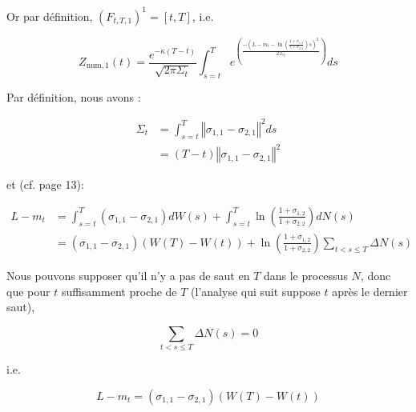 \documentclass[../finalreport.tex]{subfiles}
\begin{document}
\par Or par définition, ${\left( F_{t, T, 1}\right)}^1 = \left[ t, T \right]$, i.e.

\begin{displaymath}
Z_{\text{num}, 1} \left( t \right) =  \dfrac{e^{- {\kappa} \left( T - t\right)}}{\sqrt{2 \pi {\Sigma}_t}} {\displaystyle \int_{s = t}^{T}} e^{\left( \frac{- \left( L - m_t - \ln \left( \frac{1 + {\sigma}_{1, 2}}{1 + {\sigma}_{2, 2}} \right) s  \right)^2}{2 {\Sigma}_t} \right)} ds
\end{displaymath}

\par Par définition, nous avons : 

\begin{displaymath}
	\begin{split}
	{\Sigma}_t &= \int_{s = t}^{T} \left\Vert \sigma_{1, 1} - \sigma_{2, 1} \right\Vert^2 ds \\
			   &= (T - t) \left\Vert \sigma_{1, 1} - \sigma_{2, 1} \right\Vert^2
	\end{split}
\end{displaymath}

\par et (cf. page 13):

\begin{displaymath}
	\begin{split}
	L - m_t &= \int_{s = t}^{T} \left( \sigma_{1, 1} - \sigma_{2, 1} \right) dW(s) + \int_{s = t}^{T} \ln \left( \frac{1 + \sigma_{1, 2}}{1 + \sigma_{2, 2}} \right) dN(s) \\
	&= \left( \sigma_{1, 1} - \sigma_{2, 1} \right) \left( W\left(T\right) -  W\left(t\right) \right) + \ln \left( \frac{1 + \sigma_{1, 2}}{1 + \sigma_{2, 2}} \right) \sum\limits_{t < s \leq T} \Delta N(s)
	\end{split}
\end{displaymath}

\par Nous pouvons supposer qu'il n'y a pas de saut en $T$ dans le processus $N$, donc que pour $t$ suffisamment proche de $T$ (l'analyse qui suit suppose $t$ après le dernier saut),

\begin{displaymath}
\sum\limits_{t < s \leq T} \Delta N(s) = 0
\end{displaymath}

\par i.e.

\begin{displaymath}
L - m_t  = \left( \sigma_{1, 1} - \sigma_{2, 1} \right) \left( W\left(T\right) -  W\left(t\right) \right)
\end{displaymath}
\end{document}
